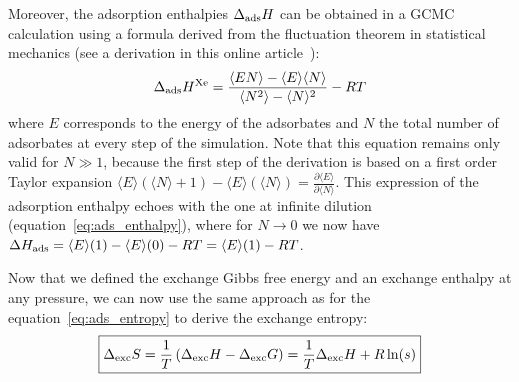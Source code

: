 \documentclass[main.tex]{subfiles}
\begin{document}
Moreover, the adsorption enthalpies $\Delta_{\text{ads}}H$ can be obtained in a GCMC calculation using a formula derived from the fluctuation theorem in statistical mechanics (see a derivation in this online article~\autocite{github_simon_gcmc}):
\begin{equation}\label{eq:ads_heat_gcmc}
  \Delta_{\text{ads}}H^{\text{Xe}} = \dfrac{\langle EN \rangle - \langle E \rangle\langle N \rangle}{\langle N^2 \rangle - \langle N \rangle^2} - RT
\end{equation}
where $E$ corresponds to the energy of the adsorbates and $N$ the total number of adsorbates at every step of the simulation. Note that this equation remains only valid for $N\gg1$, because the first step of the derivation is based on a first order Taylor expansion $\langle E \rangle(\langle N \rangle+1)-\langle E \rangle(\langle N \rangle) = \frac{\partial \langle E \rangle}{\partial \langle N \rangle}$. This expression of the adsorption enthalpy echoes with the one at infinite dilution (equation~\ref{eq:ads_enthalpy}), where for $N\rightarrow0$ we now have $\Delta H_{\text{ads}} = \langle E \rangle(1)-\langle E \rangle(0) - RT = \langle E \rangle(1) - RT$.

Now that we defined the exchange Gibbs free energy and an exchange enthalpy at any pressure, we can now use the same approach as for the equation~\ref{eq:ads_entropy} to derive the exchange entropy:
\begin{equation}\label{eq:exc_entropy}
  \boxed{
  \Delta_{\text{exc}}S = \dfrac{1}{T}\left(\Delta_{\text{exc}}H - \Delta_{\text{exc}}G\right)= \dfrac{1}{T}\Delta_{\text{exc}}H + R\ln(s)
  }
\end{equation}
\end{document}
